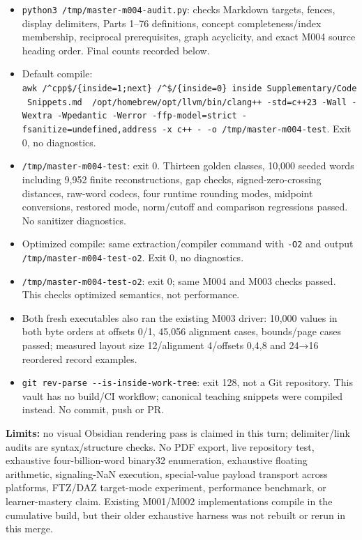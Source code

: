 \begin{itemize}
\tightlist
\item
  \texttt{python3\ /tmp/master-m004-audit.py}: checks Markdown targets, fences, display delimiters, Parts 1--76 definitions, concept completeness/index membership, reciprocal prerequisites, graph acyclicity, and exact M004 source heading order. Final counts recorded below.
\item
  Default compile: \texttt{awk\ \textquotesingle{}/\^{}\textasciigrave{}\textasciigrave{}\textasciigrave{}cpp\$/\{inside=1;next\}\ /\^{}\textasciigrave{}\textasciigrave{}\textasciigrave{}\$/\{inside=0\}\ inside\textquotesingle{}\ \textquotesingle{}Supplementary/Code\ Snippets.md\textquotesingle{}\ \textbar{}\ /opt/homebrew/opt/llvm/bin/clang++\ -std=c++23\ -Wall\ -Wextra\ -Wpedantic\ -Werror\ -ffp-model=strict\ -fsanitize=undefined,address\ -x\ c++\ -\ -o\ /tmp/master-m004-test}. Exit 0, no diagnostics.
\item
  \texttt{/tmp/master-m004-test}: exit 0. Thirteen golden classes, 10,000 seeded words including 9,952 finite reconstructions, gap checks, signed-zero-crossing distances, raw-word codecs, four runtime rounding modes, midpoint conversions, restored mode, norm/cutoff and comparison regressions passed. No sanitizer diagnostics.
\item
  Optimized compile: same extraction/compiler command with \texttt{-O2} and output \texttt{/tmp/master-m004-test-o2}. Exit 0, no diagnostics.
\item
  \texttt{/tmp/master-m004-test-o2}: exit 0; same M004 and M003 checks passed. This checks optimized semantics, not performance.
\item
  Both fresh executables also ran the existing M003 driver: 10,000 values in both byte orders at offsets 0/1, 45,056 alignment cases, bounds/page cases passed; measured layout size 12/alignment 4/offsets 0,4,8 and 24→16 reordered record examples.
\item
  \texttt{git\ rev-parse\ -\/-is-inside-work-tree}: exit 128, not a Git repository. This vault has no build/CI workflow; canonical teaching snippets were compiled instead. No commit, push or PR.
\end{itemize}

\textbf{Limits:} no visual Obsidian rendering pass is claimed in this turn; delimiter/link audits are syntax/structure checks. No PDF export, live repository test, exhaustive four-billion-word binary32 enumeration, exhaustive floating arithmetic, signaling-NaN execution, special-value payload transport across platforms, FTZ/DAZ target-mode experiment, performance benchmark, or learner-mastery claim. Existing M001/M002 implementations compile in the cumulative build, but their older exhaustive harness was not rebuilt or rerun in this merge.

